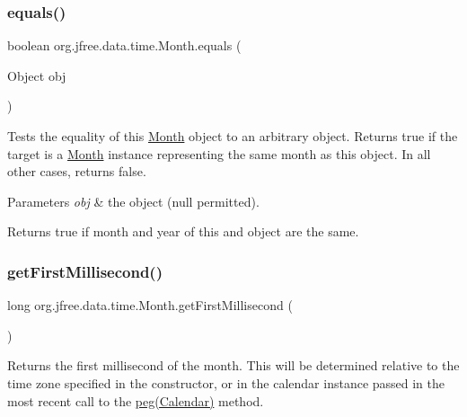 \subsubsection{\texorpdfstring{equals()}{equals()}}
{\footnotesize\ttfamily boolean org.\+jfree.\+data.\+time.\+Month.\+equals (\begin{DoxyParamCaption}\item[{Object}]{obj }\end{DoxyParamCaption})}

Tests the equality of this \mbox{\hyperlink{classorg_1_1jfree_1_1data_1_1time_1_1_month}{Month}} object to an arbitrary object. Returns true if the target is a \mbox{\hyperlink{classorg_1_1jfree_1_1data_1_1time_1_1_month}{Month}} instance representing the same month as this object. In all other cases, returns false.


\begin{DoxyParams}{Parameters}
{\em obj} & the object ({\ttfamily null} permitted).\\
\hline
\end{DoxyParams}
\begin{DoxyReturn}{Returns}
{\ttfamily true} if month and year of this and object are the same. 
\end{DoxyReturn}
\mbox{\label{classorg_1_1jfree_1_1data_1_1time_1_1_month_a87e8e3a27514d0290c33041eed3b1a83}} 
\subsubsection{\texorpdfstring{get\+First\+Millisecond()}{getFirstMillisecond()}\hspace{0.1cm}{\footnotesize\ttfamily [1/2]}}
{\footnotesize\ttfamily long org.\+jfree.\+data.\+time.\+Month.\+get\+First\+Millisecond (\begin{DoxyParamCaption}{ }\end{DoxyParamCaption})}

Returns the first millisecond of the month. This will be determined relative to the time zone specified in the constructor, or in the calendar instance passed in the most recent call to the \mbox{\hyperlink{classorg_1_1jfree_1_1data_1_1time_1_1_month_aabe5e5b144b7404d24109c8bee8c5519}{peg(\+Calendar)}} method.


